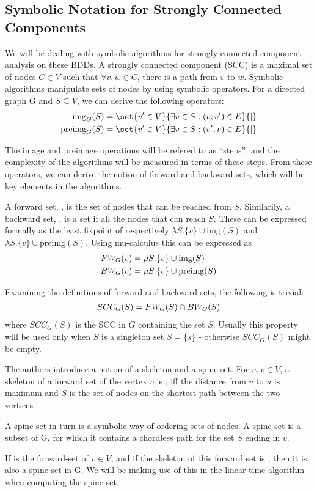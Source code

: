 \documentclass[../master/master.tex]{subfiles}
\begin{document}
\subsection{Symbolic Notation for Strongly Connected Components}
We will be dealing with symbolic algorithms for strongly connected component analysis on these BDDs. A strongly connected component (SCC) is a maximal set of nodes $C\in V$ such that $\forall v,w\in C$, there is a path from $v$ to $w$. Symbolic algorithms manipulate sets of nodes by using symbolic operators. For a directed graph G and $S\subseteq V$, we can derive the following operators: 
\begin{align*}
\img S &= \set{v' \in V}{\exists v\in S:(v, v')\in E}{|}\\
\pre S &= \set{v' \in V}{\exists v\in S:(v', v)\in E}{|}
\end{align*}

The image and preimage operations will be refered to as ``steps'', and the complexity of the algorithms will be measured in terms of these steps. 
From these operators, we can derive the notion of forward and backward sets, which will be key elements in the algorithms.

A forward set, , is the set of nodes that can be reached from $S$. Similarily, a backward set, , is a set if all the nodes that can reach $S$. These can be expressed formally as the least fixpoint of respectively $\lambda S.\{v\}\cup \text{img}(S)$ and $\lambda S.\{v\}\cup \text{preimg}(S)$. Using mu-calculus \cite{clarke_peled_grumberg_1999} this can be expressed as 
\begin{align}\label{fw}
FW_{G}(v) &= \mu S.\{v\}\cup \text{img}(S)\\
\label{bw}BW_{G}(v) &= \mu S.\{v\}\cup \text{preimg}(S)
\end{align}

\noindent Examining the definitions of forward and backward sets, the following is trivial:
\begin{align}
SCC_G(S) = FW_{G}(S) \cap BW_{G}(S) \label{scc}
\end{align} 
where $SCC_G(S)$ is the SCC in $G$ containing the set $S$. Usually this property will be used only when $S$ is a singleton set $S=\{s\}$ - otherwise $SCC_G(S)$ might be empty.

The authors \cite{linear} introduce a notion of a skeleton and a spine-set. For $u, v \in V$, a skeleton of a forward set of the vertex $v$  is , iff the distance from $v$ to $u$ is maximum and $S$ is the set of nodes on the shortest path between the two vertices.

A spine-set in turn is a symbolic way of ordering sets of nodes. A spine-set is a subset  of G, for which it contains a chordless path for the set $S$ ending in $v$.

If  is the forward-set of $v \in V$, and if the skeleton of this forward set is , then it is also a spine-set in G. We will be making use of this in the linear-time algorithm when computing the spine-set. 
\end{document}
